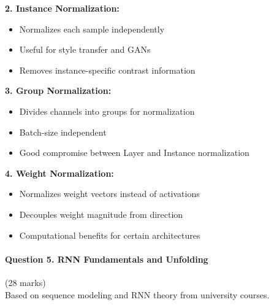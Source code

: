 \documentclass[12pt]{article}
\begin{document}
\begin{enumerate}[(a)]
{    \textbf{2. Instance Normalization:}
    \begin{itemize}
        \item Normalizes each sample independently
        \item Useful for style transfer and GANs
        \item Removes instance-specific contrast information
    \end{itemize}
    
    \textbf{3. Group Normalization:}
    \begin{itemize}
        \item Divides channels into groups for normalization
        \item Batch-size independent
        \item Good compromise between Layer and Instance normalization
    \end{itemize}
    
    \textbf{4. Weight Normalization:}
    \begin{itemize}
        \item Normalizes weight vectors instead of activations
        \item Decouples weight magnitude from direction
        \item Computational benefits for certain architectures
    \end{itemize}
    }
\end{enumerate}

\newpage
\paragraph{Question 5. RNN Fundamentals and Unfolding}\hfill (28 marks)\\
Based on sequence modeling and RNN theory from university courses.
\end{document}
